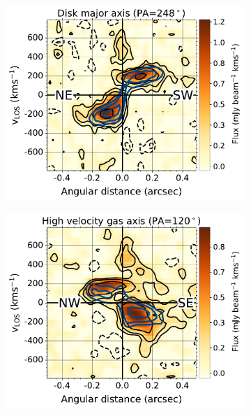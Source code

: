 \begin{figure}[!p]
    \centering
    \begin{subfigure}[b]{0.75\textwidth}
        \centering
        \includegraphics[width=\textwidth]{figures/alma_f13451_1232/pv_248deg.pdf}
    \end{subfigure}
    \hspace{1em}
    \begin{subfigure}[b]{0.75\textwidth}
        \centering
        \includegraphics[width=\textwidth]{figures/alma_f13451_1232/pv_120deg.pdf}
    \end{subfigure}

\end{figure}
